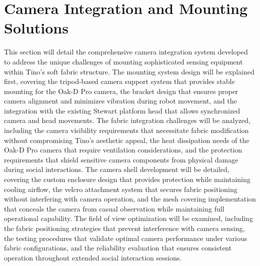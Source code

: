 \section{Camera Integration and Mounting Solutions}
This section will detail the comprehensive camera integration system developed to address the unique challenges of mounting sophisticated sensing equipment within Tino's soft fabric structure. The mounting system design will be explained first, covering the tripod-based camera support system that provides stable mounting for the Oak-D Pro camera, the bracket design that ensures proper camera alignment and minimizes vibration during robot movement, and the integration with the existing Stewart platform head that allows synchronized camera and head movements. The fabric integration challenges will be analyzed, including the camera visibility requirements that necessitate fabric modification without compromising Tino's aesthetic appeal, the heat dissipation needs of the Oak-D Pro camera that require ventilation considerations, and the protection requirements that shield sensitive camera components from physical damage during social interactions. The camera shell development will be detailed, covering the custom enclosure design that provides protection while maintaining cooling airflow, the velcro attachment system that secures fabric positioning without interfering with camera operation, and the mesh covering implementation that conceals the camera from casual observation while maintaining full operational capability. The field of view optimization will be examined, including the fabric positioning strategies that prevent interference with camera sensing, the testing procedures that validate optimal camera performance under various fabric configurations, and the reliability evaluation that ensures consistent operation throughout extended social interaction sessions.

